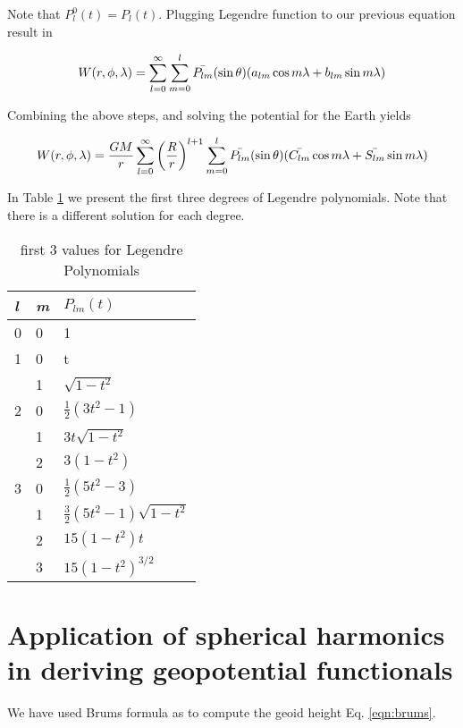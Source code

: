 Note that $P_l^0(t) = P_l(t)$. Plugging Legendre function to our previous equation result in

\begin{equation}
W(r, \phi, \lambda) = \sum_{l=0}^{\infty}\sum_{m=0}^{l}\bar{P_{lm}}(\sin \theta)(a_{lm} \cos m \lambda \\
+ b_{lm} \sin m \lambda)
\end{equation}

Combining the above steps, and solving the potential for the Earth yields

\begin{equation}
W(r, \phi, \lambda) = \frac{GM}{r}\sum_{l=0}^{\infty}\left(\frac{R}{r}\right)^{l+1}\sum_{m=0}^{l}\bar{P_{lm}}(\sin \theta)(\bar{C_{lm}} \cos m \lambda \\
+ \bar{S_{lm}} \sin m \lambda)
\end{equation}

In Table \ref{table:alfs} we present the first three degrees of Legendre polynomials. Note that there is a different solution for each degree.
\begin{table}[]
	\centering
	\caption{first 3 values for Legendre Polynomials}
	\label{table:alfs}
	\begin{tabular}{@{}lll@{}}
		\toprule
		\emph{l} & \emph{m} & $P_{lm}(t)$\\ \midrule
		0 & 0 & 1\\
		1 & 0 & t \\
		& 1 & $\sqrt{1-t^2}$\\
		2 & 0 & $\tfrac{1}{2}(3t^2-1)$\\
		& 1 & $3t\sqrt{1-t^2}$\\
		& 2 & $3(1-t^2)$\\
		3 & 0 & $\tfrac{1}{2}(5t^2-3)$\\
		& 1 & $\tfrac{3}{2}(5t^2-1)\sqrt{1-t^2}$\\
		& 2 & $15(1-t^2)t$\\
		& 3 & $15(1-t^2)^{3/2}$\\  \bottomrule
		
	\end{tabular}
\end{table}

\section{Application of spherical harmonics in deriving geopotential functionals}
We have used Brums formula as to compute the geoid height Eq. \ref{eqn:brums}. 

